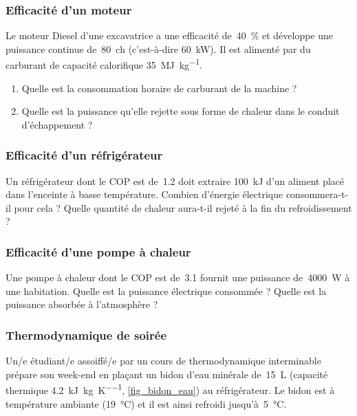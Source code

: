 \begin{boiboiboite}
	\propeau
	\propair
	\isentropiques
\end{boiboiboite}

\subsubsection{Efficacité d’un moteur}

	Le moteur Diesel d’une excavatrice a une efficacité de~\SI{40}{\percent} et développe une puissance continue de~\SI{80}{ch} (c’est-à-dire \SI{60}{\kilo\watt}). Il est alimenté par du carburant de capacité calorifique \SI{35}{\mega\joule\per\kilogram}.
	
	\begin{enumerate}
		\item Quelle est la consommation horaire de carburant de la machine ?
		\item Quelle est la puissance qu’elle rejette sous forme de chaleur dans le conduit d’échappement ?
	\end{enumerate}

\subsubsection{Efficacité d’un réfrigérateur}

	Un réfrigérateur dont le COP est de~\num{1,2} doit extraire \SI{100}{\kilo\joule} d’un aliment placé dans l’enceinte à basse température. Combien d’énergie électrique consommera-t-il pour cela ? Quelle quantité de chaleur aura-t-il rejeté à la fin du refroidissement ?
	

\subsubsection{Efficacité d’une pompe à chaleur}

	Une pompe à chaleur dont le COP est de~\num{3,1} fournit une puissance de~\SI{4000}{\watt} à une habitation. Quelle est la puissance électrique consommée ? Quelle est la puissance absorbée à l’atmosphère ?

\subsubsection{Thermodynamique de soirée}

	\begin{samepage}
	Un/e étudiant/e assoiffé/e par un cours de thermodynamique interminable prépare son week-end en plaçant un bidon d’eau minérale de~\SI{15}{\liter} (capacité thermique \SI{4,2}{\kilo\joule\per\kilogram\per\kelvin}, \cref{fig_bidon_eau}) au réfrigérateur. Le bidon est à température ambiante (\SI{19}{\degreeCelsius}) et il est ainsi refroidi jusqu’à~\SI{5}{\degreeCelsius}.
	\end{samepage} %
	

